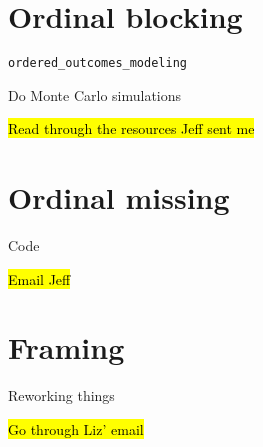 \section*{Ordinal blocking}
	\begin{coi}
		\item \texttt{ordered\_outcomes\_modeling}
			\begin{coi}
				\item Do Monte Carlo simulations
					\begin{coi}
						\item \hl{Read through the resources Jeff sent me}
					\end{coi}
			\end{coi}
	\end{coi}
	
\section*{Ordinal missing}
	\begin{coi}
		\item Code
			\begin{coi}
				\item \hl{Email Jeff}
			\end{coi}
	\end{coi}
	
\section*{Framing}
	\begin{coi}
		\item Reworking things
			\begin{coi}
				\item \hl{Go through Liz' email}
			\end{coi}
	\end{coi} 


	




